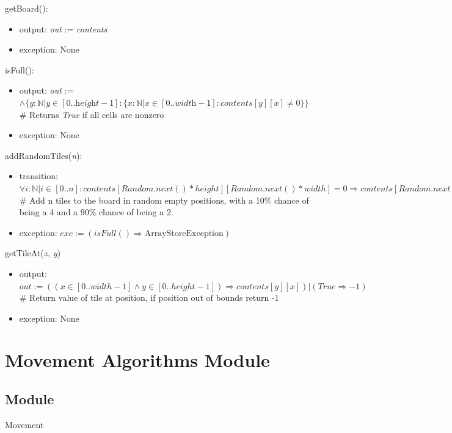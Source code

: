 \documentclass{article}
\begin{document}
			\noindent getBoard():
			\begin{itemize}
				\item output: \textit{out} := \textit{contents}
				\item exception: None
			\end{itemize}

			\noindent isFull():
			\begin{itemize}
				\item output: \textit{out} := $\wedge\{y : \mathbb{N} | y \in [0..\textit{height}-1] : \{ x : \mathbb{N} | x \in [0..\textit{width}-1] : \textit{contents}[y][x] \neq 0\}\}$ \# Returns \textit{True} if all cells are nonzero
				\item exception: None
			\end{itemize}

			\noindent addRandomTiles(\textit{n}):
			\begin{itemize}
				\item transition: $\forall i : \mathbb{N} | i \in [0..n] : contents[Random.next()*height][Random.next()*width] = 0 \Rightarrow contents[Random.next()*height][Random.next()*width] = (Random.next() < 0.9 \Rightarrow 2 | True \Rightarrow 4)$ \# Add n tiles to the board in random empty positions, with a 10\% chance of being a 4 and a 90\% chance of being a 2.
				\item exception: $exc := (isFull() \Rightarrow \textrm{ArrayStoreException})$
			\end{itemize}

			\noindent getTileAt(\textit{x}, \textit{y})
			\begin{itemize}
				\item output: $out := ((x \in [0..width-1] \wedge y \in [0..height-1]) \Rightarrow contents[y][x]) | (True \Rightarrow -1)$ \# Return value of tile at position, if position out of bounds return -1
				\item exception: None
			\end{itemize}

\newpage

\section*{Movement Algorithms Module}
	
	\subsection*{Module}
		Movement
\end{document}
